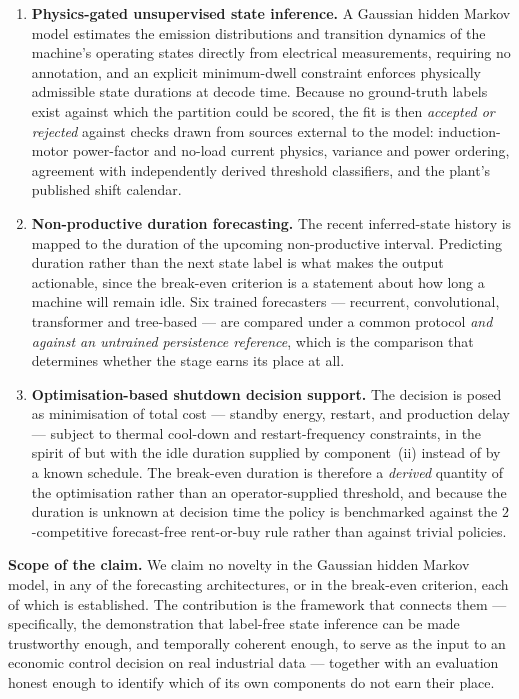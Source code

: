 \begin{enumerate}
  \item \textbf{Physics-gated unsupervised state inference.} A Gaussian
  hidden Markov model \cite{rabiner1989tutorial} estimates the emission
  distributions and transition dynamics of the machine's operating
  states directly from electrical measurements, requiring no
  annotation, and an explicit minimum-dwell constraint enforces
  physically admissible state durations at decode time. Because no
  ground-truth labels exist against which the partition could be
  scored, the fit is then \emph{accepted or rejected} against checks
  drawn from sources external to the model: induction-motor
  power-factor and no-load current physics, variance and power
  ordering, agreement with independently derived threshold classifiers,
  and the plant's published shift calendar.

  \item \textbf{Non-productive duration forecasting.} The recent
  inferred-state history is mapped to the duration of the upcoming
  non-productive interval. Predicting duration rather than the next
  state label is what makes the output actionable, since the break-even
  criterion is a statement about how long a machine will remain idle.
  Six trained forecasters --- recurrent, convolutional, transformer and
  tree-based --- are compared under a common protocol \emph{and against
  an untrained persistence reference}, which is the comparison that
  determines whether the stage earns its place at all.

  \item \textbf{Optimisation-based shutdown decision support.} The
  decision is posed as minimisation of total cost --- standby energy,
  restart, and production delay --- subject to thermal cool-down and
  restart-frequency constraints, in the spirit of
  \cite{mouzon2007operational} but with the idle duration supplied by
  component~(ii) instead of by a known schedule. The break-even
  duration is therefore a \emph{derived} quantity of the optimisation
  rather than an operator-supplied threshold, and because the duration
  is unknown at decision time the policy is benchmarked against the
  $2$-competitive forecast-free rent-or-buy rule
  \cite{karlin1994competitive} rather than against trivial policies.
\end{enumerate}

\medskip
\noindent
\textbf{Scope of the claim.} We claim no novelty in the Gaussian hidden
Markov model, in any of the forecasting architectures, or in the
break-even criterion, each of which is established. The contribution is
the framework that connects them --- specifically, the demonstration
that label-free state inference can be made trustworthy enough, and
temporally coherent enough, to serve as the input to an economic control
decision on real industrial data --- together with an evaluation
honest enough to identify which of its own components do not earn their
place.

